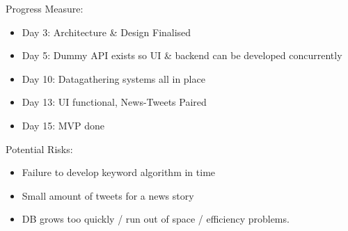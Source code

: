 \documentclass[a4paper,11pt]{article}
\begin{document}
	Progress Measure:
	
	\begin{itemize}
		\item Day 3: Architecture \& Design Finalised
		\item Day 5: Dummy API exists so UI \& backend can be developed concurrently
		\item Day 10: Datagathering systems all in place
		\item Day 13: UI functional, News-Tweets Paired
		\item Day 15: MVP done
	\end{itemize}
	
	Potential Risks:
	
	\begin{itemize}
		\item Failure to develop keyword algorithm in time
		\item Small amount of tweets for a news story
		\item DB grows too quickly / run out of space / efficiency problems.
	\end{itemize}


	
	
		
\end{document}
